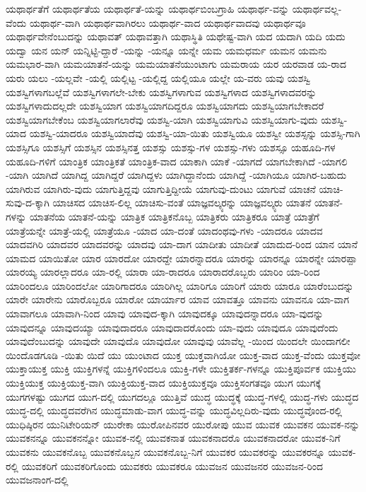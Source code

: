 {ಯಥಾರ್ಥತೆಗೆ
ಯಥಾರ್ಥತೆಯ
ಯಥಾರ್ಥತೆ-ಯನ್ನು
ಯಥಾರ್ಥಬಿಂಬಗ್ರಾಹಿ
ಯಥಾರ್ಥ-ವನ್ನು
ಯಥಾರ್ಥವಲ್ಲ-ವೆಂದು
ಯಥಾರ್ಥ-ವಾಗಿ
ಯಥಾರ್ಥವಾಗಿರಲು
ಯಥಾರ್ಥ-ವಾದ
ಯಥಾರ್ಥವಾದವು
ಯಥಾರ್ಥವೂ
ಯಥಾರ್ಥವೇನೆಂಬುದನ್ನು
ಯಥಾವತ್
ಯಥಾವತ್ತಾಗಿ
ಯಥಾಸ್ಥಿತಿ
ಯಥೇಷ್ಟ-ವಾಗಿ
ಯದ
ಯದಾಗಿ
ಯದಿ
ಯದು
ಯದ್ವಾ
ಯನ
ಯನ್
ಯನ್ನಿಟ್ಟಿ-ದ್ದಾರೆ
-ಯನ್ನು
-ಯನ್ನೂ
ಯನ್ನೇ
ಯಮ
ಯಮಧರ್ಮ
ಯಮನ
ಯಮನು
ಯಮಭಾರ-ವಾಗಿ
ಯಮಯಾತನೆ-ಯನ್ನು
ಯಮಯಾತನೆಯುಂಟಾಗು
ಯಮರಾಯ
ಯರ
ಯರವಾಡ
ಯ-ರಾದ
ಯರು
ಯಲು
-ಯಲ್ಲವೇ
-ಯಲ್ಲಿ
ಯಲ್ಲಿಟ್ಟ
-ಯಲ್ಲಿದ್ದ
ಯಲ್ಲಿಯೂ
ಯಲ್ಲೇ
ಯ-ವರು
ಯವು
ಯಶಸ್ವಿ
ಯಶಸ್ವಿಗಳಾಗಬಲ್ಲೆವೆ
ಯಶಸ್ವಿಗಳಾಗಲೇ-ಬೇಕು
ಯಶಸ್ವಿಗಳಾಗುವ
ಯಶಸ್ವಿಗಳಾದ
ಯಶಸ್ವಿಗಳಾದವರನ್ನು
ಯಶಸ್ವಿಗಳಾದುದಲ್ಲದೇ
ಯಶಸ್ವಿಯಾಗ
ಯಶಸ್ವಿಯಾಗದಿದ್ದರೂ
ಯಶಸ್ವಿಯಾಗದು
ಯಶಸ್ವಿಯಾಗಬೇಕಾದರೆ
ಯಶಸ್ವಿಯಾಗಬೇಕೆಂಬ
ಯಶಸ್ವಿಯಾಗಲಾರೆವು
ಯಶಸ್ವಿ-ಯಾಗಿ
ಯಶಸ್ವಿಯಾಗುವಿ
ಯಶಸ್ವಿಯಾಗು-ವುದು
ಯಶಸ್ವಿ-ಯಾದ
ಯಶಸ್ವಿ-ಯಾದರೂ
ಯಶಸ್ವಿಯಾದೆವು
ಯಶಸ್ವಿ-ಯಾ-ಯಿತು
ಯಶಸ್ವಿಯೂ
ಯಶಸ್ವೀ
ಯಶಸ್ಸನ್ನು
ಯಶಸ್ಸಿ-ಗಾಗಿ
ಯಶಸ್ಸಿಗೂ
ಯಶಸ್ಸಿಗೆ
ಯಶಸ್ಸಿನ
ಯಶಸ್ಸಿನತ್ತ
ಯಶಸ್ಸು
ಯಶಸ್ಸು-ಗಳ
ಯಶಸ್ಸು-ಗಳು
ಯಶಸ್ಸೂ
ಯಹೂದಿ-ಗಳ
ಯಹೂದಿ-ಗಳಿಗೆ
ಯಾಂತ್ರಿಕ
ಯಾಂತ್ರಿಕತೆ
ಯಾಂತ್ರಿಕ-ವಾದ
ಯಾಕಾಗಿ
ಯಾಕೆ
-ಯಾಗದೆ
ಯಾಗಬೇಕಾಗಿದೆ
-ಯಾಗಲಿ
-ಯಾಗಿ
ಯಾಗಿದೆ
ಯಾಗಿದ್ದ
ಯಾಗಿದ್ದರೆ
ಯಾಗಿದ್ದಳು
ಯಾಗಿದ್ದಾನೆಂದು
ಯಾಗಿದ್ದೆ
-ಯಾಗಿಯೂ
ಯಾಗಿರ-ಬಹುದು
ಯಾಗಿರುವ
ಯಾಗಿರು-ವುದು
ಯಾಗುತ್ತಿದ್ದವು
ಯಾಗುತ್ತಿದ್ದೀಯೆ
ಯಾಗುವು-ದುಂಟು
ಯಾಗುವೆ
ಯಾಚನೆ
ಯಾಚಿ-ಸುವು-ದ-ಕ್ಕಾಗಿ
ಯಾಚಿಸದ
ಯಾಚಿಸ-ಲಿಲ್ಲ
ಯಾಚಿಸು-ವಂತೆ
ಯಾಜ್ಞವಲ್ಕ್ಯರನ್ನು
ಯಾಜ್ಞವಲ್ಕ್ಯರು
ಯಾತನೆ
ಯಾತನೆ-ಗಳನ್ನು
ಯಾತನೆಯ
ಯಾತನೆ-ಯನ್ನು
ಯಾತ್ರಿಕ
ಯಾತ್ರಿಕನೊಬ್ಬ
ಯಾತ್ರಿಕರು
ಯಾತ್ರಿಕರೂ
ಯಾತ್ರೆ
ಯಾತ್ರೆಗೆ
ಯಾತ್ರೆಯನ್ನೇ
ಯಾತ್ರೆ-ಯಲ್ಲಿ
ಯಾತ್ರೆಯೂ
-ಯಾದ
ಯಾ-ದಂತೆ
ಯಾದಂಥವು-ಗಳು
-ಯಾದರೂ
ಯಾದವ
ಯಾದವಗಿರಿ
ಯಾದವರ
ಯಾದವರನ್ನು
ಯಾದವು
ಯಾ-ದಾಗ
ಯಾದೀತು
ಯಾದೀತೆ
ಯಾದುದ-ರಿಂದ
ಯಾನ
ಯಾನೆ
ಯಾಮದ
ಯಾಯಿತೋ
ಯಾರ
ಯಾರದೋ
ಯಾರದ್ದೇ
ಯಾರನ್ನಾದರೂ
ಯಾರನ್ನು
ಯಾರನ್ನೂ
ಯಾರನ್ನೇ
ಯಾರಪ್ಪಾ
ಯಾರಯ್ಯ
ಯಾರಲ್ಲಾದರೂ
ಯಾ-ರಲ್ಲಿ
ಯಾರಾ
ಯಾ-ರಾದರೂ
ಯಾರಾದರೊಬ್ಬರು
ಯಾರಿಂ
ಯಾ-ರಿಂದ
ಯಾರಿಂದಲೂ
ಯಾರಿಂದಲೋ
ಯಾರಿಗಾದರೂ
ಯಾರಿಗಿಲ್ಲ
ಯಾರಿಗೂ
ಯಾರಿಗೆ
ಯಾರು
ಯಾರೂ
ಯಾರೆಂಬುದನ್ನು
ಯಾರೇ
ಯಾರೇನು
ಯಾರೊಬ್ಬರೂ
ಯಾರೋ
ಯಾರ್ಯಾರ
ಯಾವ
ಯಾವತ್ತೂ
ಯಾವನು
ಯಾವನೂ
ಯಾ-ವಾಗ
ಯಾವಾಗಲೂ
ಯಾವಾಗಿ-ನಿಂದ
ಯಾವು
ಯಾವುದ-ಕ್ಕಾಗಿ
ಯಾವುದಕ್ಕೂ
ಯಾವುದನ್ನಾದರೂ
ಯಾ-ವುದನ್ನು
ಯಾವುದನ್ನೂ
ಯಾವುದಯ್ಯಾ
ಯಾವುದಾದರೂ
ಯಾವುದಾದರೊಂದು
ಯಾ-ವುದು
ಯಾವುದೂ
ಯಾವುದೆಂದು
ಯಾವುದೆಂಬುದನ್ನು
ಯಾವುದೇ
ಯಾವುದೊ
ಯಾವುದೋ
ಯಾವುವು
ಯಾವೆಲ್ಲ
-ಯಿಂದ
ಯಿಂದಲೇ
ಯಿಂದಾಗಲೀ
ಯಿಂದೊಡಗೂಡಿ
-ಯಿತು
ಯಿದೆ
ಯು
ಯುಂಟಾದ
ಯುಕ್ತ
ಯುಕ್ತವಾಗಿಯೋ
ಯುಕ್ತ-ವಾದ
ಯುಕ್ತ-ವೆಂದು
ಯುಕ್ತವೋ
ಯುಕ್ತಾಯುಕ್ತ
ಯುಕ್ತಿ
ಯುಕ್ತಿಗಳನ್ನೆ
ಯುಕ್ತಿಗಳಿಂದಲೂ
ಯುಕ್ತಿ-ಗಳೇ
ಯುಕ್ತಿತರ್ಕ-ಗಳನ್ನೂ
ಯುಕ್ತಿಪೂರ್ವಕ
ಯುಕ್ತಿಯು
ಯುಕ್ತಿಯುಕ್ತ
ಯುಕ್ತಿಯುಕ್ತ-ವಾಗಿ
ಯುಕ್ತಿಯುಕ್ತ-ವಾದ
ಯುಕ್ತಿಯುಕ್ತವೂ
ಯುಕ್ತಿಸಂಗತವೂ
ಯುಗ
ಯುಗಕ್ಕೆ
ಯುಗಗಳಷ್ಟು
ಯುಗದ
ಯುಗ-ದಲ್ಲಿ
ಯುಗದಲ್ಲೂ
ಯುತ್ತಿವೆ
ಯುದ್ಧ
ಯುದ್ಧಕ್ಕೆ
ಯುದ್ಧ-ಗಳಲ್ಲಿ
ಯುದ್ಧ-ಗಳು
ಯುದ್ಧದ
ಯುದ್ಧ-ದಲ್ಲಿ
ಯುದ್ಧದವರೆಗಿನ
ಯುದ್ಧಮಾಡು-ವಾಗ
ಯುದ್ಧ-ವನ್ನು
ಯುದ್ಧವಿಲ್ಲದಿರು-ವುದು
ಯುದ್ಧವೊಂದ-ರಲ್ಲಿ
ಯುಧಿಷ್ಠಿರನ
ಯುನಿಟೇರಿಯನ್
ಯುರೇಕಾ
ಯುರೋಪಿನವರ
ಯುರೋಪು
ಯುವ
ಯುವಕ
ಯುವಕನ
ಯುವಕ-ನನ್ನು
ಯುವಕನನ್ನೂ
ಯುವಕನನ್ನೋ
ಯುವಕ-ನಲ್ಲಿ
ಯುವಕನಾತ
ಯುವಕನಾದರೊ
ಯುವಕನಾದರೋ
ಯುವಕ-ನಿಗೆ
ಯುವಕನು
ಯುವಕನೊಬ್ಬ
ಯುವಕನೊಬ್ಬನ
ಯುವಕನೊಬ್ಬ-ನಿಗೆ
ಯುವಕರ
ಯುವಕರನ್ನು
ಯುವಕರನ್ನೂ
ಯುವಕ-ರಲ್ಲಿ
ಯುವಕರಿಗೆ
ಯುವಕರಿಗೊಂದು
ಯುವಕರು
ಯುವಕರೂ
ಯುವಜನ
ಯುವಜನರ
ಯುವಜನ-ರಿಂದ
ಯುವಜನಾಂಗ-ದಲ್ಲಿ
}
